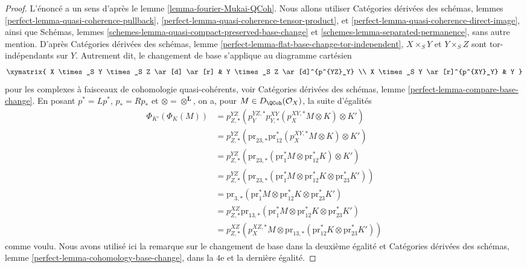 \begin{proof}
L'énoncé a un sens d'après le lemme \ref{lemma-fourier-Mukai-QCoh}.
Nous allons utiliser
Catégories dérivées des schémas, lemmes
\ref{perfect-lemma-quasi-coherence-pullback},
\ref{perfect-lemma-quasi-coherence-tensor-product}, et
\ref{perfect-lemma-quasi-coherence-direct-image},
ainsi que Schémas, lemmes
\ref{schemes-lemma-quasi-compact-preserved-base-change} et
\ref{schemes-lemma-separated-permanence},
sans autre mention.
D'après Catégories dérivées des schémas, lemme
\ref{perfect-lemma-flat-base-change-tor-independent},
$X \times_S Y$ et $Y \times_S Z$ sont tor-indépendants
sur $Y$. Autrement dit, le changement de base s'applique au diagramme cartésien
$$
\xymatrix{
X \times_S Y \times_S Z \ar[d] \ar[r] &
Y \times_S Z \ar[d]^{p^{YZ}_Y} \\
X \times_S Y \ar[r]^{p^{XY}_Y} & Y
}
$$
pour les complexes à faisceaux de cohomologie quasi-cohérents, voir
Catégories dérivées des schémas, lemme \ref{perfect-lemma-compare-base-change}.
En posant $p^* = Lp^*$, $p_* = Rp_*$ et $\otimes = \otimes^\mathbf{L}$,
on a, pour $M \in D_\QCoh(\mathcal{O}_X)$, la suite d'égalités
\begin{align*}
\Phi_{K'}(\Phi_K(M))
& =
p^{YZ}_{Z, *}(p^{YZ, *}_Y p^{XY}_{Y, *}(p^{XY, *}_X M \otimes K) \otimes K') \\
& =
p^{YZ}_{Z, *}(\text{pr}_{23, *} \text{pr}_{12}^*(p^{XY, *}_X M \otimes K)
\otimes K') \\
& =
p^{YZ}_{Z, *}(\text{pr}_{23, *}(\text{pr}_1^*M \otimes \text{pr}_{12}^*K)
\otimes K') \\
& =
p^{YZ}_{Z, *}(\text{pr}_{23, *}(\text{pr}_1^*M \otimes \text{pr}_{12}^*K
\otimes \text{pr}_{23}^*K')) \\
& =
\text{pr}_{3, *}(\text{pr}_1^*M \otimes \text{pr}_{12}^*K
\otimes \text{pr}_{23}^*K') \\
& =
p^{XZ}_{Z, *}\text{pr}_{13, *}(\text{pr}_1^*M \otimes \text{pr}_{12}^*K
\otimes \text{pr}_{23}^*K') \\
& =
p^{XZ}_{Z, *} (p^{XZ, *}_X M \otimes \text{pr}_{13, *}(\text{pr}_{12}^*K
\otimes \text{pr}_{23}^*K'))
\end{align*}
comme voulu. Nous avons utilisé ici la remarque sur le changement de base dans la
deuxième égalité et Catégories dérivées des schémas, lemme
\ref{perfect-lemma-cohomology-base-change}, dans la $4$e et la
dernière égalité.
\end{proof}

